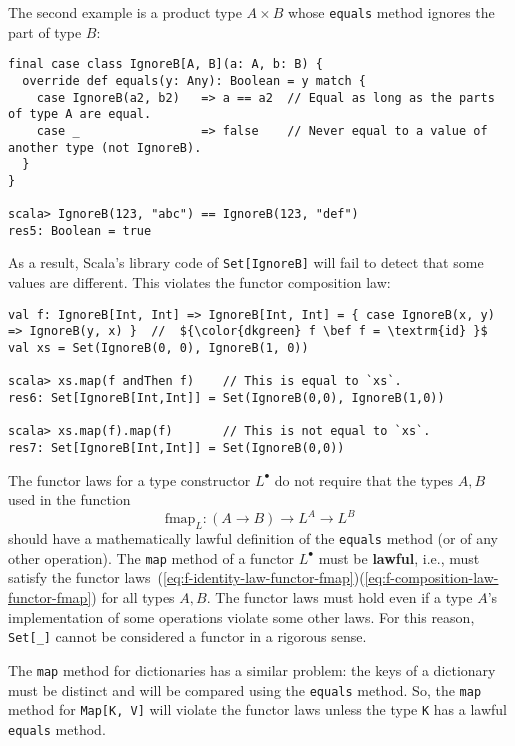 The second example is a product type $A\times B$ whose \lstinline!equals!
method ignores the part of type $B$:
\begin{lstlisting}
final case class IgnoreB[A, B](a: A, b: B) {
  override def equals(y: Any): Boolean = y match {
    case IgnoreB(a2, b2)   => a == a2  // Equal as long as the parts of type A are equal.
    case _                 => false    // Never equal to a value of another type (not IgnoreB).
  }
}

scala> IgnoreB(123, "abc") == IgnoreB(123, "def")
res5: Boolean = true
\end{lstlisting}
As a result, Scala\textsf{'}s library code of \lstinline!Set[IgnoreB]! will
fail to detect that some values are different. This violates the functor
composition law:
\begin{lstlisting}[mathescape=true]
val f: IgnoreB[Int, Int] => IgnoreB[Int, Int] = { case IgnoreB(x, y) => IgnoreB(y, x) }  //  ${\color{dkgreen} f \bef f = \textrm{id} }$
val xs = Set(IgnoreB(0, 0), IgnoreB(1, 0))

scala> xs.map(f andThen f)    // This is equal to `xs`.
res6: Set[IgnoreB[Int,Int]] = Set(IgnoreB(0,0), IgnoreB(1,0))

scala> xs.map(f).map(f)       // This is not equal to `xs`.
res7: Set[IgnoreB[Int,Int]] = Set(IgnoreB(0,0))
\end{lstlisting}

The functor laws for a type constructor $L^{\bullet}$ do not require
that the types $A,B$ used in the function
\[
\text{fmap}_{L}:\left(A\rightarrow B\right)\rightarrow L^{A}\rightarrow L^{B}
\]
should have a mathematically lawful definition of the \lstinline!equals!
method (or of any other operation). The \lstinline!map! method of
a functor $L^{\bullet}$ must be \textbf{lawful},
i.e., must satisfy the functor laws~(\ref{eq:f-identity-law-functor-fmap})\textendash (\ref{eq:f-composition-law-functor-fmap})
for all types $A,B$. The functor laws must hold even if a type $A$\textsf{'}s
implementation of some operations violate some other laws. For this
reason, \lstinline!Set[_]! cannot be considered a functor in a rigorous
sense.

The \lstinline!map! method for dictionaries has a similar problem:
the keys of a dictionary must be distinct and will be compared using
the \lstinline!equals! method. So, the \lstinline!map! method for
\lstinline!Map[K, V]! will violate the functor laws unless the type
\lstinline!K! has a lawful \lstinline!equals! method.

